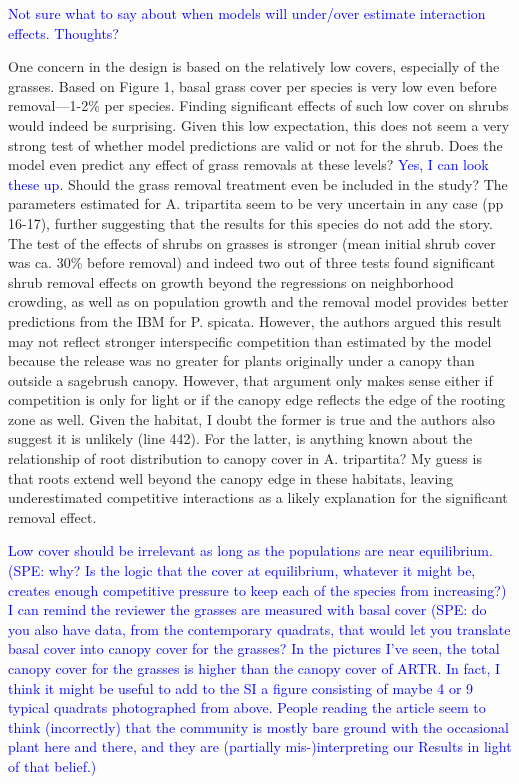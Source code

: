 \documentclass[12pt]{article}
\newcommand{\response}{\textcolor{blue}}
\begin{document}
{\response{Not sure what to say about when models will under/over estimate interaction effects. Thoughts?}

One concern in the design is based on the relatively low covers, especially of the grasses. Based on
Figure 1, basal grass cover per species is very low even before removal—1-2\% per species. Finding
significant effects of such low cover on shrubs would indeed be surprising. Given this low expectation,
this does not seem a very strong test of whether model predictions are valid or not for the shrub. Does
the model even predict any effect of grass removals at these levels? \response{Yes, I can look these up}. Should the grass removal
treatment even be included in the study? The parameters estimated for A. tripartita seem to be very
uncertain in any case (pp 16-17), further suggesting that the results for this species do not add the story.
The test of the effects of shrubs on grasses is stronger (mean initial shrub cover was ca. 30\% before
removal) and indeed two out of three tests found significant shrub removal effects on growth beyond
the regressions on neighborhood crowding, as well as on population growth and the removal model
provides better predictions from the IBM for P. spicata. However, the authors argued this result may
not reflect stronger interspecific competition than estimated by the model because the release was no
greater for plants originally under a canopy than outside a sagebrush canopy. However, that argument
only makes sense either if competition is only for light or if the canopy edge reflects the edge of the
rooting zone as well. Given the habitat, I doubt the former is true and the authors also suggest it is
unlikely (line 442). For the latter, is anything known about the relationship of root distribution to
canopy cover in A. tripartita? My guess is that roots extend well beyond the canopy edge in these
habitats, leaving underestimated competitive interactions as a likely explanation for the significant
removal effect.

\response{Low cover should be irrelevant as long as the populations are near equilibrium. (SPE: why? Is the logic that
the cover at equilibrium, whatever it might be, creates enough competitive pressure to keep each of the species
from increasing?) I can remind the reviewer the grasses are measured with basal cover (SPE: do you also have data, from the
contemporary quadrats, that would let you translate basal cover into canopy cover for the grasses? In the pictures I've seen,
the total canopy cover for the grasses is higher than the canopy cover of ARTR. In fact, I think it might be useful to add to the
SI a figure consisting of maybe 4 or 9 typical quadrats photographed from above. People reading the article seem to think (incorrectly) 
that the community is mostly bare ground with the occasional plant here and there, and they are (partially mis-)interpreting our Results in light
of that belief.)}

}
\end{document}
